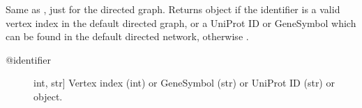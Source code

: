 \documentclass[letterpaper,10pt,english]{sphinxmanual}
\begin{document}
\begin{fulllineitems}
\begin{fulllineitems}
\end{fulllineitems}


\begin{fulllineitems}
\label{\detokenize{reference:pypath.main.PyPath.dgss}}
\end{fulllineitems}


\begin{fulllineitems}
\label{\detokenize{reference:pypath.main.PyPath.dneighbors}}
\end{fulllineitems}


\begin{fulllineitems}
\label{\detokenize{reference:pypath.main.PyPath.dp}}
Same as , just for the directed graph.
Returns  object if the identifier
is a valid vertex index in the default directed graph,
or a UniProt ID or GeneSymbol which can be found in the
default directed network, otherwise .
\begin{description}
\item[{@identifier}] \leavevmode{[}int, str{]}
Vertex index (int) or GeneSymbol (str) or UniProt ID (str) or
 object.

\end{description}

\end{fulllineitems}


\begin{fulllineitems}
\label{\detokenize{reference:pypath.main.PyPath.dproteins}}
\end{fulllineitems}


\end{fulllineitems}
\end{document}
